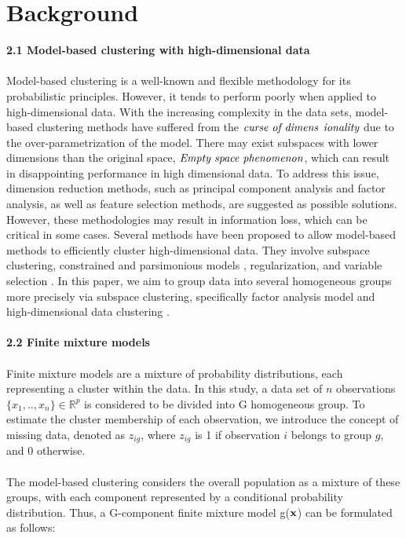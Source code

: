 \documentclass[11pt]{article}
\begin{document}
\section{Background}
\textbf{2.1 Model-based clustering with high-dimensional data}\\
\\
Model-based clustering is a well-known and flexible methodology for its probabilistic principles. However, it tends to perform poorly when applied to high-dimensional data. With the increasing complexity in the data sets, model-based clustering methods have suffered from the $\emph{curse of dimens}$ $\emph{ionality}$ due to the over-parametrization of the model. There may exist subspaces with lower dimensions than the original space, $\emph{Empty space phenomenon}$, which can result in disappointing performance in high dimensional data. To address this issue, dimension reduction methods, such as principal component analysis and factor analysis, as well as feature selection methods, are suggested as possible solutions. However, these methodologies may result in information loss, which can be critical in some cases. Several methods have been proposed to allow model-based methods to efficiently cluster high-dimensional data. They involve subspace clustering, constrained and parsimonious models \citep{mcnicholas2008parsimonious}, regularization, and variable selection \citep{bouveyron2007high}. In this paper, we aim to group data into several homogeneous groups more precisely via subspace clustering, specifically factor analysis model \citep{mcnicholas2008parsimonious} and high-dimensional data clustering \citep{kim2019subspace}.
\\ \\
\textbf{2.2 Finite mixture models}\\
\\
Finite mixture models are a mixture of probability distributions, each representing a cluster within the data. In this study, a data set of $n$ observations $\{x_1,..,x_n\}\in\mathbb{R}^p$ is considered to be divided into G homogeneous group. To estimate the cluster membership of each observation, we introduce the concept of missing data, denoted as $z_{ig}$, where $z_{ig}$ is 1 if observation $i$ belongs to group $g$, and 0 otherwise.\\
\\
The model-based clustering considers the overall population as a mixture of these groups, with each component represented by a conditional probability distribution. Thus, a G-component finite mixture model g($\bold{x}$) can be formulated as follows:
\end{document}
